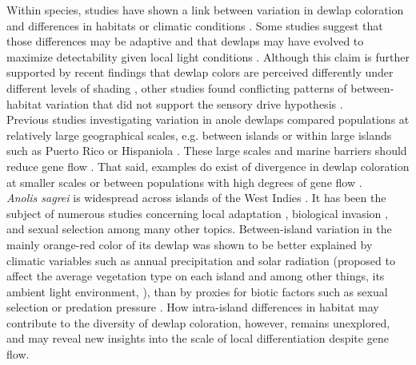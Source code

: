 Within species, studies have shown a link between variation in dewlap coloration and differences in habitats or climatic conditions \citep{Macedonia2001, Leal2002, Thorpe2002, Thorpe2002a, Leal2004, Vanhooydonck2009, Ng2012, Ng2013, Ng2016, Vanhooydonck2009, Driessens2017}. Some studies suggest that those differences may be adaptive and that dewlaps may have evolved to maximize detectability given local light conditions \citep{Fleishman2001, Leal2002, Leal2004}. Although this claim is further supported by recent findings that dewlap colors are perceived differently under different levels of shading \citep{Fleishman2020}, other studies found conflicting patterns of between-habitat variation that did not support the sensory drive hypothesis \citep{Fleishman2009, Ng2012, Macedonia2014}.\\ 

Previous studies investigating variation in anole dewlaps compared populations at relatively large geographical scales, e.g. between islands \citep{Vanhooydonck2009, Driessens2017} or within large islands such as Puerto Rico \citep{Leal2004} or Hispaniola \citep{Ng2012, Ng2016}. These large scales and marine barriers should reduce gene flow \citep{Ng2011, Lambert2013, Richardson2014, Ng2017}. That said, examples do exist of divergence in dewlap coloration at smaller scales or between populations with high degrees of gene flow \citep{Thorpe2002, Thorpe2002a, Stapley2011, Ng2016}.\\

\textit{Anolis sagrei} is widespread across islands of the West Indies \citep{Reynolds2020}. It has been the subject of numerous studies concerning local adaptation \citep{Losos1994, Losos1997a, Losos2001, Kolbe2012}, biological invasion \citep{Kolbe2008}, and sexual selection \citep{Tokarz2002, Tokarz2005, Tokarz2006, Driessens2014, Steffen2014, Driessens2015} among many other topics. Between-island variation in the mainly orange-red color of its dewlap was shown to be better explained by climatic variables such as annual precipitation and solar radiation (proposed to affect the average vegetation type on each island and among other things, its ambient light environment, \citealt{Driessens2017}),  than by proxies for biotic factors such as sexual selection or predation pressure \citep{Vanhooydonck2009, Baeckens2018}. How intra-island differences in habitat may contribute to the diversity of dewlap coloration, however, remains unexplored, and may reveal new insights into the scale of local differentiation despite gene flow.\\

